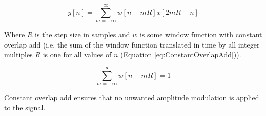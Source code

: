 		\begin{equation}
			y[n] = \sum_{m = -\infty}^{\infty} w[n - mR]x[2mR - n]
			\label{eq:STTR}
		\end{equation}

		Where $R$ is the step size in samples and $w$ is some window function with constant overlap add (i.e. the
		sum of the window function translated in time by all integer multiples $R$ is one for all values of $n$
		(Equation \ref{eq:ConstantOverlapAdd})).

		\begin{equation}
			\sum_{m = -\infty}^{\infty} w[n - mR] = 1
			\label{eq:ConstantOverlapAdd}
		\end{equation}

		Constant overlap add ensures that no unwanted amplitude modulation is applied to the signal.
